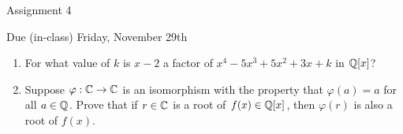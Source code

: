 \documentclass[11pt,fleqn,dvipsnames,usenames]{article}
\renewcommand{\headrulewidth}{1pt}
\begin{document}
\fancyhead[L]{\course}
\fancyhead[R]{\term}
\renewcommand{\headrulewidth}{0.4pt}

\begin{center}
{\huge Assignment 4}
\vsp

{\large Due (in-class) Friday, November 29th}
\end{center}

\begin{enumerate}
\item For what value of $k$ is $x - 2$ a factor of $x^4 - 5x^3 + 5x^2 + 3x + k$ in $\mathbb{Q}[x]$?
\item Suppose $\varphi:\mathbb{C}\to\mathbb{C}$ is an isomorphism with the property that $\varphi(a) = a$ for all $a\in \mathbb{Q}$.  Prove that if $r\in\mathbb{C}$ is a root of $f(x)\in \mathbb{Q}[x]$, then $\varphi(r)$ is also a root of $f(x)$.
\end{enumerate}
\end{document}
